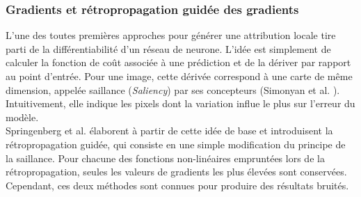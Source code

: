 \subsubsection{Gradients et rétropropagation guidée des gradients}
L'une des toutes premières approches pour générer une attribution locale tire parti de la différentiabilité d'un réseau de neurone. L'idée est simplement de calculer la fonction de coût associée à une prédiction et de la dériver par rapport au point d'entrée. Pour une image, cette dérivée correspond à une carte de même dimension, appelée \og saillance \fg (\textit{Saliency}) par ses concepteurs (Simonyan et al. \cite{DBLP:journals/corr/SimonyanVZ13}). Intuitivement, elle indique les pixels dont la variation influe le plus sur l'erreur du modèle. \\
Springenberg et al. \cite{DB15a} élaborent à partir de cette idée de base et introduisent la rétropropagation guidée, qui consiste en une simple modification du principe de la saillance. Pour chacune des fonctions non-linéaires empruntées lors de la rétropropagation, seules les valeurs de gradients les plus élevées sont conservées. Cependant, ces deux méthodes sont connues pour produire des résultats bruités.

